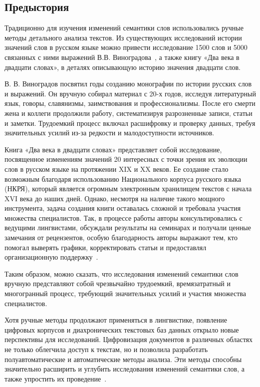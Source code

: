 \documentclass[LI,VKR]{HSEUniversity}
\begin{document}
\subsection{Предыстория}
Традиционно для изучения изменений семантики слов использовались ручные методы детального
анализа текстов.
Из существующих исследований истории значений слов в русском языке можно привести
исследование 1500 слов и 5000 связанных с ними выражений В.В. Виноградова~\cite{VinogradovWordHistory},
а также книгу «Два века в двадцати словах», в деталях описывающую историю значения двадцати слов.

В. В. Виноградов посвятил годы созданию монографии по истории русских слов и выражений.
Он вручную собирал материал с 20-х годов, исследуя литературный язык, говоры, славянизмы,
заимствования и профессионализмы.
После его смерти жена и коллеги продолжили работу, систематизируя разрозненные записи, статьи и заметки.
Трудоемкий процесс включал расшифровку и проверку данных,
требуя значительных усилий из-за редкости и малодоступности источников.

Книга «Два века в двадцати словах» представляет собой исследование,
посвященное изменениям значений 20 интересных с точки зрения их эволюции слов в русском языке на
протяжении XIX и XX веков.
Ее создание стало возможным благодаря использованию Национального корпуса русского языка (НКРЯ),
который является огромным электронным хранилищем текстов с начала XVI века до наших дней.
Однако, несмотря на наличие такого мощного инструмента,
задача создания книги оставалась сложной и требовала участия множества специалистов.
Так, в процессе работы авторы консультировались с ведущими лингвистами,
обсуждали результаты на семинарах и получали ценные замечания от рецензентов,
особую благодарность авторы выражают тем, кто помогал выверять графики,
корректировать статьи и предоставлял организационную поддержку~\cite{TwoCenturies}.

Таким образом, можно сказать, что исследования изменений семантики слов вручную
представляют собой чрезвычайно трудоемкий, времязатратный и многогранный процесс,
требующий значительных усилий и участия множества специалистов.

Хотя ручные методы продолжают применяться в лингвистике,
появление цифровых корпусов и диахронических текстовых баз данных открыло новые перспективы для исследований.
Цифровизация документов в различных областях не только облегчила доступ к текстам,
но и позволила разработать полуавтоматические и автоматические методы анализа.
Эти методы способны значительно расширить и углубить исследования изменений семантики слов,
а также упростить их проведение~\cite{TahmasebiComputationalApproachesToSemanticChange}.
\end{document}
